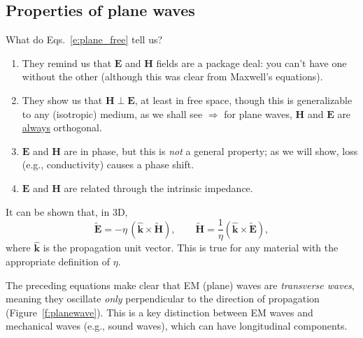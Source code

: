 \documentclass[11pt, oneside]{article}
\begin{document}
\subsection{Properties of plane waves}

What do Eqs.~\eqref{e:plane_free} tell us?
\begin{enumerate}
	\item They remind us that $\mathbf{E}$ and $\mathbf{H}$ fields are a package deal: you can't have one without the other (although this was clear from Maxwell's equations).
	\item They show us that $\mathbf{H} \perp \mathbf{E}$, at least in free space, though this is generalizable to any (isotropic) medium, as we shall see $\Rightarrow$ for plane waves, $\mathbf{H}$ and $\mathbf{E}$ are \underline{always} orthogonal.
	\item $\mathbf{E}$ and $\mathbf{H}$ are in phase, but this is \emph{not} a general property; as we will show, loss (e.g., conductivity) causes a phase shift.
	\item $\mathbf{E}$ and $\mathbf{H}$ are related through the intrinsic impedance.
\end{enumerate}

It can be shown that, in 3D,
\begin{equation}
	\label{e:khat}
	\tilde{\mathbf{E}} = -\eta\,(\hat{\mathbf{k}}\times\tilde{\mathbf{H}}),
	\qquad
	\tilde{\mathbf{H}} = \frac{1}{\eta}(\hat{\mathbf{k}}\times\tilde{\mathbf{E}}),
\end{equation}
where $\hat{\mathbf{k}}$ is the propagation unit vector. This is true for any material with the appropriate definition of $\eta$.

The preceding equations make clear that EM (plane) waves are \emph{transverse waves}, meaning they oscillate \emph{only} perpendicular to the direction of propagation (Figure~\ref{f:planewave}). This is a key distinction between EM waves and mechanical waves (e.g., sound waves), which can have longitudinal components.
\end{document}
